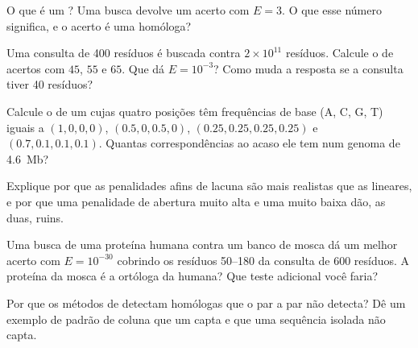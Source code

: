 \begin{exercise}[$\star$]\label{exo:b3:bioinformatics:4}
O que é um ? Uma busca devolve um acerto com $E = 3$. O que
esse número significa, e o acerto é uma homóloga?
\end{exercise}

\begin{exercise}[$\star\star$]\label{exo:b3:bioinformatics:5}
Uma consulta de \num{400} resíduos é buscada contra $2\times 10^{11}$
resíduos. Calcule o  de acertos com  $45$, $55$ e
$65$. Que  dá $E = 10^{-3}$? Como muda a resposta se a
consulta tiver \num{40} resíduos?
\end{exercise}

\begin{exercise}[$\star\star$]\label{exo:b3:bioinformatics:6}
Calcule o  de um  cujas quatro posições têm
frequências de base (A, C, G, T) iguais a $(1,0,0,0)$,
$(0.5,0,0.5,0)$, $(0.25,0.25,0.25,0.25)$ e $(0.7,0.1,0.1,0.1)$.
Quantas correspondências ao acaso ele tem num genoma de \qty{4.6}{Mb}?
\end{exercise}

\begin{exercise}[$\star\star$]\label{exo:b3:bioinformatics:7}
Explique por que as penalidades afins de lacuna são mais realistas que
as lineares, e por que uma penalidade de abertura muito alta e uma
muito baixa dão, as duas,  ruins.
\end{exercise}

\begin{exercise}[$\star\star$]\label{exo:b3:bioinformatics:8}
Uma busca  de uma proteína humana contra um banco de mosca dá um
melhor acerto com $E = 10^{-30}$ cobrindo os resíduos 50--180 da
consulta de \num{600} resíduos. A proteína da mosca é a ortóloga da
humana? Que teste adicional você faria?
\end{exercise}

\begin{exercise}[$\star\star$]\label{exo:b3:bioinformatics:9}
Por que os métodos de  detectam homólogas que o  par a
par não detecta? Dê um exemplo de padrão de coluna que um  capta
e que uma sequência isolada não capta.
\end{exercise}


